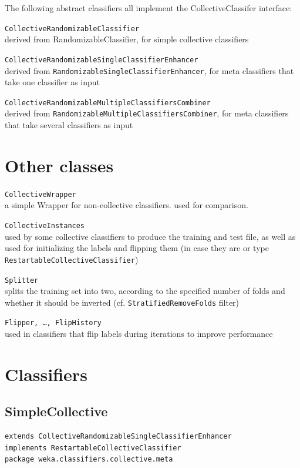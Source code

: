 \documentclass[a4paper]{book}
\begin{document}
The following abstract classifiers all implement the CollectiveClassifer interface:
\begin{tight_itemize}
	\item \texttt{CollectiveRandomizableClassifier} \\
	derived from RandomizableClassifier, for simple collective classifiers
	\item \texttt{CollectiveRandomizableSingleClassifierEnhancer} \\
	derived from \texttt{RandomizableSingleClassifierEnhancer}, for meta classifiers 
	that take one classifier as input
	\item \texttt{CollectiveRandomizableMultipleClassifiersCombiner} \\
	derived from \texttt{RandomizableMultipleClassifiersCombiner}, for meta 
	classifiers that take several classifiers as input
\end{tight_itemize}

\section{Other classes}
\begin{tight_itemize}
	\item \texttt{CollectiveWrapper} \\
	a simple Wrapper for non-collective classifiers. used for comparison.
	\item \texttt{CollectiveInstances} \\
	used by some collective classifiers to produce the training and test file, 
	as well as used for initializing the labels and flipping them (in case 
	they are or type \texttt{RestartableCollectiveClassifier})
	\item \texttt{Splitter} \\
	splits the training set into two, according to the specified number of 
	folds and whether it should be inverted (cf. \texttt{StratifiedRemoveFolds} filter)
	\item \texttt{Flipper, \ldots, FlipHistory} \\
	used in classifiers that flip labels during iterations to improve performance
\end{tight_itemize}

\section{Classifiers}
\subsection{SimpleCollective}
\begin{verbatim}
extends CollectiveRandomizableSingleClassifierEnhancer
implements RestartableCollectiveClassifier
package weka.classifiers.collective.meta
\end{verbatim}
\end{document}
